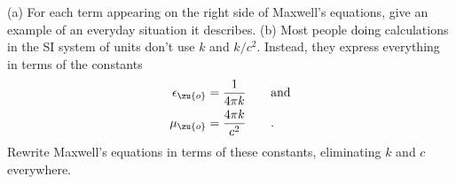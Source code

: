         (a) For each term appearing on the right side of Maxwell's equations, give
        an example of an everyday situation it describes.\hwendpart
        (b) Most people doing calculations in the SI system of units don't use
        $k$ and $k/c^2$. Instead, they express everything in terms of
        the constants
        \begin{align*}
                \epsilon_\zu{o}&=\frac{1}{4\pi k} \qquad \text{and} \\
                 \mu_\zu{o}&=\frac{4\pi k}{c^2} \qquad .
        \end{align*}
        Rewrite Maxwell's equations in terms of these constants, eliminating
        $k$ and $c$ everywhere.
